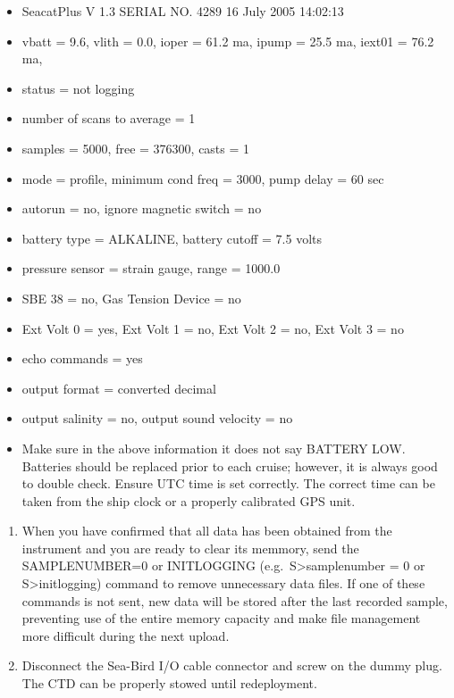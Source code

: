 \documentclass[]{book}
\providecommand{\tightlist}{%
  \setlength{\itemsep}{0pt}\setlength{\parskip}{0pt}}
\begin{document}
\begin{enumerate}
  \begin{itemize}
  \tightlist
  \item
    SeacatPlus V 1.3 SERIAL NO. 4289 16 July 2005 14:02:13
  \item
    vbatt = 9.6, vlith = 0.0, ioper = 61.2 ma, ipump = 25.5 ma, iext01 =
    76.2 ma,
  \item
    status = not logging
  \item
    number of scans to average = 1
  \item
    samples = 5000, free = 376300, casts = 1
  \item
    mode = profile, minimum cond freq = 3000, pump delay = 60 sec
  \item
    autorun = no, ignore magnetic switch = no
  \item
    battery type = ALKALINE, battery cutoff = 7.5 volts
  \item
    pressure sensor = strain gauge, range = 1000.0
  \item
    SBE 38 = no, Gas Tension Device = no
  \item
    Ext Volt 0 = yes, Ext Volt 1 = no, Ext Volt 2 = no, Ext Volt 3 = no
  \item
    echo commands = yes
  \item
    output format = converted decimal
  \item
    output salinity = no, output sound velocity = no
  \end{itemize}
\end{enumerate}

\begin{itemize}
\tightlist
\item
  Make sure in the above information it does not say BATTERY LOW.
  Batteries should be replaced prior to each cruise; however, it is
  always good to double check. Ensure UTC time is set correctly. The
  correct time can be taken from the ship clock or a properly calibrated
  GPS unit.
\end{itemize}

\begin{enumerate}
\def\labelenumi{\arabic{enumi}.}
\setcounter{enumi}{4}
\tightlist
\item
  When you have confirmed that all data has been obtained from the
  instrument and you are ready to clear its memmory, send the
  SAMPLENUMBER=0 or INITLOGGING (e.g.~S\textgreater{}samplenumber = 0 or
  S\textgreater{}initlogging) command to remove unnecessary data files.
  If one of these commands is not sent, new data will be stored after
  the last recorded sample, preventing use of the entire memory capacity
  and make file management more difficult during the next upload.
\item
  Disconnect the Sea-Bird I/O cable connector and screw on the dummy
  plug. The CTD can be properly stowed until redeployment.
\end{enumerate}
\end{document}
